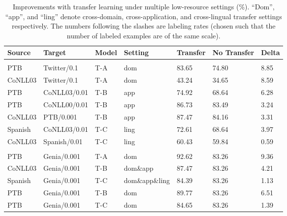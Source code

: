 \begin{table}[t]
\vspace{-0.1in}
\caption{\small Improvements with transfer learning under multiple low-resource settings (\%). ``Dom'', ``app'', and ``ling'' denote cross-domain, cross-application, and cross-lingual transfer settings respectively. The numbers following the slashes are labeling rates (chosen such that the number of labeled examples are of the same scale).}
\label{tab:imp}
\begin{center}
\begin{tabular}{lllllll}
Source & Target & Model & Setting & Transfer & No Transfer & Delta
\\ \hline \\
PTB & Twitter/0.1 & T-A & dom & 83.65 & 74.80 & 8.85 \\
CoNLL03 & Twitter/0.1 & T-A & dom & 43.24 & 34.65 & 8.59 \\
PTB & CoNLL03/0.01 & T-B & app & 74.92 & 68.64 & 6.28 \\
PTB & CoNLL00/0.01 & T-B & app & 86.73 & 83.49 & 3.24 \\
CoNLL03 & PTB/0.001 & T-B & app & 87.47 & 84.16 & 3.31 \\
Spanish & CoNLL03/0.01 & T-C & ling & 72.61 & 68.64 & 3.97 \\
CoNLL03 & Spanish/0.01 & T-C & ling & 60.43 & 59.84 & 0.59 \\
\hline \\
PTB & Genia/0.001 & T-A & dom & 92.62 & 83.26 & 9.36 \\
CoNLL03 & Genia/0.001 & T-B & dom\&app & 87.47 & 83.26 & 4.21 \\
Spanish & Genia/0.001 & T-C & dom\&app\&ling & 84.39 & 83.26 & 1.13 \\
PTB & Genia/0.001 & T-B & dom & 89.77 & 83.26 & 6.51 \\
PTB & Genia/0.001 & T-C & dom & 84.65 & 83.26 & 1.39 \\
\end{tabular}
\end{center}
\end{table}


